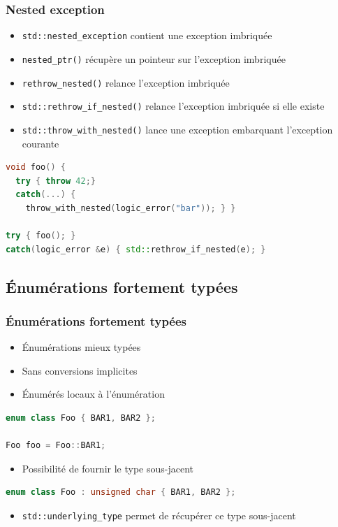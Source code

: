 \documentclass[C++.tex]{subfiles}
\begin{document}
\begin{frame}[fragile]
	\frametitle{Nested exception}
	\begin{itemize}
		\item \lstinline|std::nested_exception| contient une exception imbriquée
		\item \lstinline|nested_ptr()| récupère un pointeur sur l'exception imbriquée
		\item \lstinline|rethrow_nested()| relance l'exception imbriquée
		\item \lstinline|std::rethrow_if_nested()| relance l'exception imbriquée si elle existe
		\item \lstinline|std::throw_with_nested()| lance une exception embarquant l'exception courante
	\end{itemize}

	\begin{lstlisting}[language=C++]
void foo() {
  try { throw 42;}
  catch(...) { 
    throw_with_nested(logic_error("bar")); } }

try { foo(); }
catch(logic_error &e) { std::rethrow_if_nested(e); }\end{lstlisting}
\end{frame}

\subsection*{Énumérations fortement typées}
\begin{frame}[fragile]
	\frametitle{Énumérations fortement typées}
	\begin{itemize}
		\item Énumérations mieux typées
		\item Sans conversions implicites


		\item Énumérés locaux à l'énumération
	\end{itemize}

	\begin{lstlisting}[language=C++]
enum class Foo { BAR1, BAR2 };

Foo foo = Foo::BAR1;\end{lstlisting}

	\begin{itemize}
		\item Possibilité de fournir le type sous-jacent

	\end{itemize}

	\begin{lstlisting}[language=C++]
enum class Foo : unsigned char { BAR1, BAR2 };\end{lstlisting}

	\begin{itemize}
		\item \lstinline|std::underlying_type| permet de récupérer ce type sous-jacent
	\end{itemize}
\end{frame}
\end{document}
